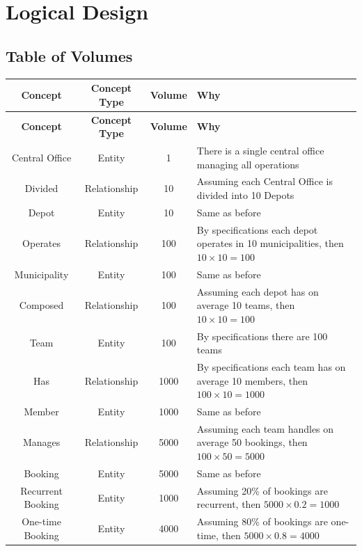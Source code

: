 \section{Logical Design}

\subsection{Table of Volumes}

\begin{longtable}{|c|c|c|p{8cm}|}
    \hline
    \textbf{Concept} & \textbf{Concept Type} & \textbf{Volume} & \textbf{Why} \\
    \hline
    \endfirsthead
    \hline
    \textbf{Concept} & \textbf{Concept Type} & \textbf{Volume} & \textbf{Why} \\
    \hline
    \endhead
    Central Office & Entity & 1 & There is a single central office managing all operations \\
    \hline
    Divided & Relationship & 10 & Assuming each Central Office is divided into 10 Depots \\
    \hline
    Depot & Entity & 10 & Same as before \\
    \hline
    Operates & Relationship & 100 & By specifications each depot operates in 10 municipalities, then $10 \times 10 = 100$ \\
    \hline
    Municipality & Entity & 100 & Same as before \\
    \hline
    Composed & Relationship & 100 & Assuming each depot has on average 10 teams, then $10 \times 10 = 100$ \\
    \hline
    Team & Entity & 100 & By specifications there are 100 teams \\
    \hline
    Has & Relationship & 1000 & By specifications each team has on average 10 members, then $100 \times 10 = 1000$ \\
    \hline
    Member & Entity & 1000 & Same as before \\
    \hline
    Manages & Relationship & 5000 & Assuming each team handles on average 50 bookings, then $100 \times 50 = 5000$ \\
    \hline
    Booking & Entity & 5000 & Same as before \\
    \hline
    Recurrent Booking & Entity & 1000 & Assuming 20\% of bookings are recurrent, then $5000 \times 0.2 = 1000$ \\
    \hline
    One-time Booking & Entity & 4000 & Assuming 80\% of bookings are one-time, then $5000 \times 0.8 = 4000$ \\

\end{longtable}
